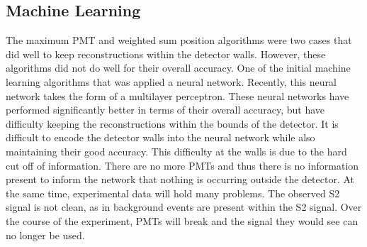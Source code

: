 \documentclass[thesis.tex]{subfiles}
\begin{document}
\subsection{Machine Learning}\label{subsec:ML}
The maximum PMT and weighted sum position algorithms were two cases that did well to keep reconstructions within the detector walls.
However, these algorithms did not do well for their overall accuracy.
One of the initial machine learning algorithms that was applied a neural network.
Recently, this neural network takes the form of a multilayer perceptron.
These neural networks have performed significantly better in terms of their overall accuracy, but have difficulty keeping the reconstructions within the bounds of the detector.
It is difficult to encode the detector walls into the neural network while also maintaining their good accuracy.
This difficulty at the walls is due to the hard cut off of information.
There are no more PMTs and thus there is no information present to inform the network that nothing is occurring outside the detector.
At the same time, experimental data will hold many problems.
The observed S2 signal is not clean, as in background events are present within the S2 signal.
Over the course of the experiment, PMTs will break and the signal they would see can no longer be used.
\end{document}
